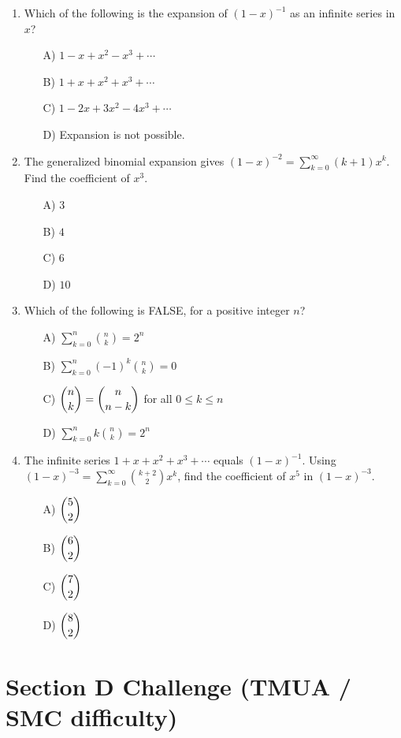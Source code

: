 \documentclass[11pt,a4paper]{article}
\begin{document}
\begin{enumerate}
\item Which of the following is the expansion of $(1-x)^{-1}$ as an infinite series in $x$?
\begin{itemize}
\item[A)] $1-x+x^2-x^3+\cdots$
\item[B)] $1+x+x^2+x^3+\cdots$
\item[C)] $1-2x+3x^2-4x^3+\cdots$
\item[D)] Expansion is not possible.
\end{itemize}

\item The generalized binomial expansion gives $(1-x)^{-2}=\sum_{k=0}^\infty(k+1)x^k$. Find the coefficient of $x^3$.
\begin{itemize}
\item[A)] $3$
\item[B)] $4$
\item[C)] $6$
\item[D)] $10$
\end{itemize}

\item Which of the following is FALSE, for a positive integer $n$?
\begin{itemize}
\item[A)] $\displaystyle\sum_{k=0}^n\binom nk=2^n$
\item[B)] $\displaystyle\sum_{k=0}^n(-1)^k\binom nk=0$
\item[C)] $\dbinom nk=\dbinom n{n-k}$ for all $0\leq k\leq n$
\item[D)] $\displaystyle\sum_{k=0}^n k\binom nk=2^n$
\end{itemize}

\item The infinite series $1+x+x^2+x^3+\cdots$ equals $(1-x)^{-1}$. Using $(1-x)^{-3}=\sum_{k=0}^\infty\binom{k+2}{2}x^k$, find the coefficient of $x^5$ in $(1-x)^{-3}$.
\begin{itemize}
\item[A)] $\dbinom52$
\item[B)] $\dbinom62$
\item[C)] $\dbinom72$
\item[D)] $\dbinom82$
\end{itemize}

\end{enumerate}

\section*{Section D \quad Challenge \hfill{\normalfont\small(TMUA / SMC difficulty)}}
\end{document}
